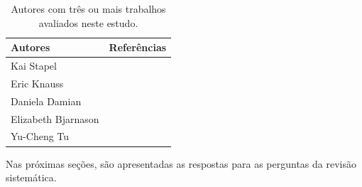 \begin{table}[h!]
\label{tab:autores1}
\caption{Autores com três ou mais trabalhos avaliados neste estudo.}
\begin{tabular}{|p{5cm}|p{9cm}|}
\hline
\textbf{Autores}                                     &                  \textbf{Referências}                                                                                                               \\ \hline
Kai Stapel                                          &

\cite{Stapel} 
\cite{stapel2011flow}
\cite{knauss2013v}
\cite{knauss2014openness}
\cite{knauss2012detecting}
                \\ \hline
Eric Knauss                                         &
\cite{knauss2013v}
\cite{knauss2014openness}
\cite{knauss2012detecting}
                \\ \hline
Daniela Damian                                     &         
\cite{6606709}
\cite{knauss2014openness}
\cite{damian2008need}
\cite{knauss2012detecting}

                                                                          \\ \hline
Elizabeth Bjarnason                                 &
\cite{bjarnason2017role}
\cite{bjarnason2012evidence}
\cite{bjarnason2011requirements}

                                                                           \\ \hline
Yu-Cheng Tu                                           &

\cite{tu2016experiment}
\cite{6130643}


                         \\ \hline
\end{tabular}
\end{table}


Nas próximas seções, são apresentadas as respostas para as perguntas da revisão sistemática.

